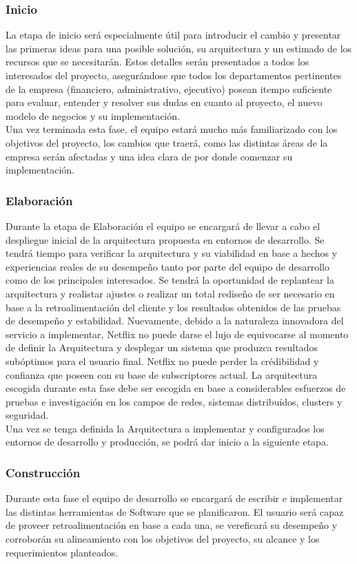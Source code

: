 \documentclass{article}
\begin{document}
\subsubsection{Inicio}
La etapa de inicio será especialmente útil para introducir el 
cambio y presentar las primeras ideas para una posible solución, su 
arquitectura y un estimado de los recursos que se necesitarán.
Estos detalles serán presentados a todos los interesados del proyecto,
asegurándose que todos los departamentos pertinentes de la empresa
(financiero, administrativo, ejecutivo) posean itempo suficiente
para evaluar, entender y resolver sus dudas en cuanto al proyecto,
el nuevo modelo de negocios y su implementación. \\
Una vez terminada esta fase, el equipo estará mucho más familiarizado
con los objetivos del proyecto, los cambios que traerá, como las
distintas áreas de la empresa serán afectadas y una idea clara
de por donde comenzar su implementación.
\subsubsection{Elaboración}
Durante la etapa de Elaboración el equipo se encargará de 
llevar a cabo el despliegue inicial de la arquitectura propuesta en 
entornos de desarrollo. Se tendrá tiempo para verificar la 
arquitectura y su viabilidad en base a hechos y experiencias reales
de su desempeño tanto por parte del equipo de desarrollo como 
de los principales interesados. Se tendrá la oportunidad de replantear
la arquitectura y realistar ajustes o realizar un total rediseño
de ser necesario en base a la retroalimentación del cliente y los
resultados obtenidos de las pruebas de desempeño y estabilidad.
Nuevamente, debido a la naturaleza innovadora del servicio a
implementar, Netflix no puede darse el lujo de equivocarse al momento
de definir la Arquitectura y desplegar un sistema que produzca
resultados subóptimos para el usuario final. Netflix no puede perder
la crédibilidad y confianza que poseen con su base de subscriptores
actual. La arquitectura escogida durante esta fase debe ser escogida
en base a considerables esfuerzos de pruebas e investigación en los
campos de redes, sistemas distribuídos, clusters y seguridad.
\\
Una vez se tenga definida la Arquitectura a implementar y configurados
los entornos de desarrollo y producción, se podrá dar inicio a la 
siguiente etapa.
\subsubsection{Construcción}
Durante esta fase el equipo de desarrollo
se encargará de escribir e implementar las distintas herramientas
de Software que se planificaron. El usuario será capaz de proveer
retroalimentación en base a cada una, se vereficará su desempeño
y corroborán su alineamiento con los objetivos del proyecto, 
su alcance y los requerimientos planteados.
\end{document}

